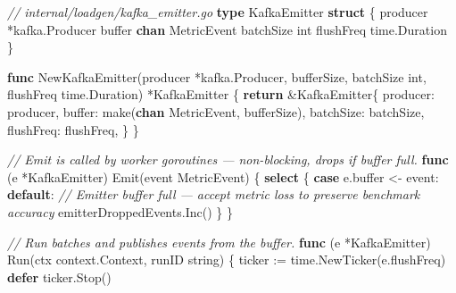 \documentclass[
]{article}
\newenvironment{Shaded}{}{}
\newcommand{\BuiltInTok}[1]{\textcolor[rgb]{0.00,0.50,0.00}{#1}}
\newcommand{\CommentTok}[1]{\textcolor[rgb]{0.38,0.63,0.69}{\textit{#1}}}
\newcommand{\ControlFlowTok}[1]{\textcolor[rgb]{0.00,0.44,0.13}{\textbf{#1}}}
\newcommand{\DataTypeTok}[1]{\textcolor[rgb]{0.56,0.13,0.00}{#1}}
\newcommand{\KeywordTok}[1]{\textcolor[rgb]{0.00,0.44,0.13}{\textbf{#1}}}
\newcommand{\NormalTok}[1]{#1}
\newcommand{\OperatorTok}[1]{\textcolor[rgb]{0.40,0.40,0.40}{#1}}
\begin{document}
\begin{Shaded}
\begin{Highlighting}[]
\CommentTok{// internal/loadgen/kafka\_emitter.go}
\KeywordTok{type}\NormalTok{ KafkaEmitter }\KeywordTok{struct} \OperatorTok{\{}
\NormalTok{    producer  }\OperatorTok{*}\NormalTok{kafka}\OperatorTok{.}\NormalTok{Producer}
\NormalTok{    buffer    }\KeywordTok{chan}\NormalTok{ MetricEvent}
\NormalTok{    batchSize }\DataTypeTok{int}
\NormalTok{    flushFreq time}\OperatorTok{.}\NormalTok{Duration}
\OperatorTok{\}}

\KeywordTok{func}\NormalTok{ NewKafkaEmitter}\OperatorTok{(}\NormalTok{producer }\OperatorTok{*}\NormalTok{kafka}\OperatorTok{.}\NormalTok{Producer}\OperatorTok{,}\NormalTok{ bufferSize}\OperatorTok{,}\NormalTok{ batchSize }\DataTypeTok{int}\OperatorTok{,}\NormalTok{ flushFreq time}\OperatorTok{.}\NormalTok{Duration}\OperatorTok{)} \OperatorTok{*}\NormalTok{KafkaEmitter }\OperatorTok{\{}
    \ControlFlowTok{return} \OperatorTok{\&}\NormalTok{KafkaEmitter}\OperatorTok{\{}
\NormalTok{        producer}\OperatorTok{:}\NormalTok{  producer}\OperatorTok{,}
\NormalTok{        buffer}\OperatorTok{:}    \BuiltInTok{make}\OperatorTok{(}\KeywordTok{chan}\NormalTok{ MetricEvent}\OperatorTok{,}\NormalTok{ bufferSize}\OperatorTok{),}
\NormalTok{        batchSize}\OperatorTok{:}\NormalTok{ batchSize}\OperatorTok{,}
\NormalTok{        flushFreq}\OperatorTok{:}\NormalTok{ flushFreq}\OperatorTok{,}
    \OperatorTok{\}}
\OperatorTok{\}}

\CommentTok{// Emit is called by worker goroutines — non{-}blocking, drops if buffer full.}
\KeywordTok{func} \OperatorTok{(}\NormalTok{e }\OperatorTok{*}\NormalTok{KafkaEmitter}\OperatorTok{)}\NormalTok{ Emit}\OperatorTok{(}\NormalTok{event MetricEvent}\OperatorTok{)} \OperatorTok{\{}
    \ControlFlowTok{select} \OperatorTok{\{}
    \ControlFlowTok{case}\NormalTok{ e}\OperatorTok{.}\NormalTok{buffer }\OperatorTok{\textless{}{-}}\NormalTok{ event}\OperatorTok{:}
    \ControlFlowTok{default}\OperatorTok{:}
        \CommentTok{// Emitter buffer full — accept metric loss to preserve benchmark accuracy}
\NormalTok{        emitterDroppedEvents}\OperatorTok{.}\NormalTok{Inc}\OperatorTok{()}
    \OperatorTok{\}}
\OperatorTok{\}}

\CommentTok{// Run batches and publishes events from the buffer.}
\KeywordTok{func} \OperatorTok{(}\NormalTok{e }\OperatorTok{*}\NormalTok{KafkaEmitter}\OperatorTok{)}\NormalTok{ Run}\OperatorTok{(}\NormalTok{ctx context}\OperatorTok{.}\NormalTok{Context}\OperatorTok{,}\NormalTok{ runID }\DataTypeTok{string}\OperatorTok{)} \OperatorTok{\{}
\NormalTok{    ticker }\OperatorTok{:=}\NormalTok{ time}\OperatorTok{.}\NormalTok{NewTicker}\OperatorTok{(}\NormalTok{e}\OperatorTok{.}\NormalTok{flushFreq}\OperatorTok{)}
    \ControlFlowTok{defer}\NormalTok{ ticker}\OperatorTok{.}\NormalTok{Stop}\OperatorTok{()}


\end{Highlighting}
\end{Shaded}
\end{document}
